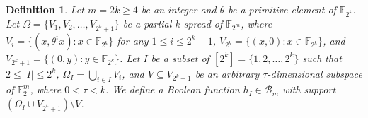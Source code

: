 \documentclass[10pt]{article}
\newtheorem{definition}{Definition}
\newcommand{\F}{\mathbb{F}}
\newcommand{\0}{\textbf{0}}
\newcommand{\1}{\textbf{1}}
\newcommand{\W}[2][]{\widehat{\chi_{#2}}^{#1}}
\newcommand{\CardI}{\left|I\right|}
\begin{document}
{\begin{definition}\label{D:h_I}
Let $m=2k\geq 4$ be an integer and $\theta$ be a primitive element of $\F_{2^k}$.
Let $\Omega=\{V_1,V_2,\ldots,V_{2^k+1}\}$ be a partial $k$-spread of $\F_{2^m}$,
where $V_i=\{(x, \theta^{i}x) : x\in\F_{2^k}\}$ for any $1\leq i \leq 2^k-1$, $V_{2^k}=\{(x,0) : x\in\F_{2^k}\}$,  and $V_{2^k+1}=\{(0, y) : y\in \F_{2^k}\}$.
Let $I$ be a subset of $[2^k]=\{1,2, \ldots, 2^k\}$ such that $2\leq \CardI\leq 2^k$,  $\Omega_I=\bigcup_{i\in I}V_i$, and $V\subseteq V_{2^k+1}$ be an
arbitrary $\tau$-dimensional subspace of $\F_2^m$, where $0<\tau<k$.
We define a Boolean function $h_I\in\mathcal{B}_{m}$  with support $(\Omega_I\cup V_{2^k+1})\setminus V$.
\end{definition}

}
\end{document}
